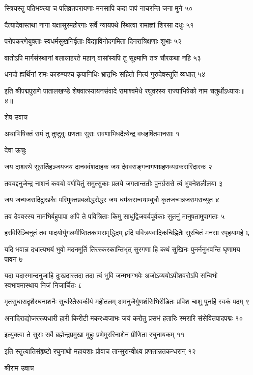 स्त्रियस्तु पतिभक्त्या च पतिव्रतपरायणाः
मनसापि कदा पापं नाचरन्ति जना मुने ५०

दैत्यादेवास्तथा नागा यक्षासुरमहोरगाः
सर्वे न्यायपथे स्थित्वा रामाज्ञां शिरसा दधुः ५१

परोपकरणेयुक्ताः स्वधर्मसुखनिर्वृताः
विद्याविनोदगमिता दिनरात्रिक्षणाः शुभाः ५२

वातोऽपि मार्गसंस्थानां बलान्नाहरते महान्
वासांस्यपि तु सूक्ष्माणि तत्र चौरकथा नहि ५३

धनदो ह्यर्थिनां रामः कारुण्यश्च कृपानिधिः
भ्रातृभिः सहितो नित्यं गुरुदेवस्तुतिं व्यधात् ५४

इति श्रीपद्मपुराणे पातालखण्डे शेषवात्स्यायनसंवादे रामाश्वमेधे रघुवरस्य राज्याभिषेको नाम चतुर्थोऽध्यायः॥४॥


शेष उवाच

अथाभिषिक्तं रामं तु तुष्टुवुः प्रणताः सुराः
रावणाभिधदैत्येन्द्र वधहर्षितमानसाः १

देवा ऊचुः

जय दाशरथे सुरार्तिहञ्जयजय दानववंशदाहक
जय देववराङ्गनागणग्रहणव्यग्रकरारिदारक २

तवयद्दनुजेन्द्र नाशनं कवयो वर्णयितुं समुत्सुकाः
प्रलये जगतान्ततीः पुनर्ग्रससे त्वं भुवनेशलीलया ३

जय जन्मजरादिदुःखकैः परिमुक्तप्रबलोद्धरोद्धर
जय धर्मकरान्वयाम्बुधौ कृतजन्मन्नजरामराच्युत ४

तव देववरस्य नामभिर्बहुपापा अपि ते पवित्रिताः
किमु साधुद्विजवर्यपूर्वकाः सुतनुं मानुषतामुपागताः ५

हरविरिञ्चिनुतं तव पादयोर्युगलमीप्सितकामसमृद्धिदम्
हृदि पवित्रयवादिकचिह्नितैः सुरचितं मनसा स्पृहयामहे ६

यदि भवान्न दधात्यभयं भुवो मदनमूर्ति तिरस्करकान्तिभृत्
सुरगणा हि कथं सुखिनः पुनर्ननुभवन्ति घृणामय पावन ७

यदा यदास्मान्दनुजाहि दुःखदास्तदा तदा त्वं भुवि जन्मभाग्भवेः
अजोऽव्ययोऽपीशवरोऽपि सन्विभो स्वभावमास्थाय निजं निजार्चितः ८

मृतसुधासदृशैरघनाशनैः सुचरितैरवकीर्य महीतलम्
अमनुजैर्गुणशंसिभिरीडितः प्रविश चाशु पुनर्हि स्वकं पदम् ९

अनादिराद्योजररूपधारी हारी किरीटी मकरध्वजाभः
जयं करोतु प्रसभं हतारिः स्मरारि संसेवितपादपद्मः १०

इत्युक्त्वा ते सुराः सर्वे ब्रह्मेन्द्रप्रमुखा मुहुः
प्रणेमुररिनाशेन प्रीणिता रघुनायकम् ११

इति स्तुत्यातिसंहृष्टो रघुनाथो महायशाः
प्रोवाच तान्सुरान्वीक्ष्य प्रणतान्नतकन्धरान् १२

श्रीराम उवाच

